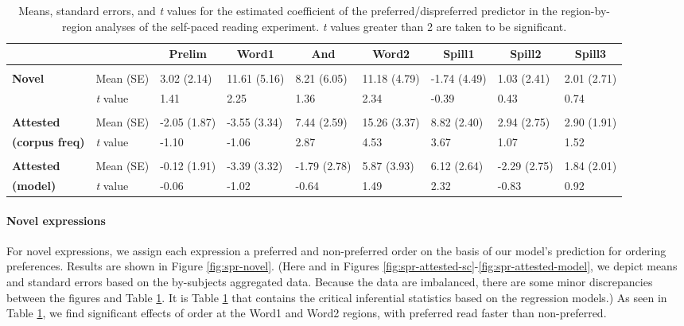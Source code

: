 \documentclass[authoryear]{elsarticle}
\begin{document}
%
\begin{table}[!tbp]
\scriptsize
\caption{Means, standard errors, and \emph{t} values for the estimated coefficient of the preferred/dispreferred predictor in the region-by-region analyses of the self-paced reading experiment. \emph{t} values greater than 2 are taken to be significant.\label{tab:spr-results}} 
\begin{center}
\begin{tabular}{lllllllll}
\hline\hline
\multicolumn{1}{l}{}&\multicolumn{1}{l}{}&\multicolumn{1}{c}{Prelim}&\multicolumn{1}{c}{Word1}&\multicolumn{1}{c}{And}&\multicolumn{1}{c}{Word2}&\multicolumn{1}{c}{Spill1}&\multicolumn{1}{c}{Spill2}&\multicolumn{1}{c}{Spill3}\tabularnewline
\hline
&&&&&&&\tabularnewline
\textbf{Novel}&Mean (SE)&3.02 (2.14)&11.61 (5.16)&8.21 (6.05)&11.18 (4.79)&-1.74 (4.49)&1.03 (2.41)&2.01 (2.71)\tabularnewline
&\emph{t} value&1.41&2.25&1.36&2.34&-0.39&0.43&0.74\tabularnewline
\hline
&&&&&&&\tabularnewline
\textbf{Attested}&Mean (SE)&-2.05 (1.87)&-3.55 (3.34)&7.44 (2.59)&15.26 (3.37)&8.82 (2.40)&2.94 (2.75)&2.90 (1.91)\tabularnewline
\textbf{(corpus freq)}&\emph{t} value&-1.10&-1.06&2.87&4.53&3.67&1.07&1.52\tabularnewline
\hline
&&&&&&&\tabularnewline
\textbf{Attested}&Mean (SE)&-0.12 (1.91)&-3.39 (3.32)&-1.79 (2.78)&5.87 (3.93)&6.12 (2.64)&-2.29 (2.75)&1.84 (2.01)\tabularnewline
\textbf{(model)}&\emph{t} value&-0.06&-1.02&-0.64&1.49&2.32&-0.83&0.92\tabularnewline
\hline
\end{tabular}
\end{center}
\end{table}

\paragraph{Novel expressions}
For novel expressions, we assign each expression a preferred and non-preferred order on the basis of our model's prediction for ordering preferences. Results are shown in Figure \ref{fig:spr-novel}. (Here and in Figures \ref{fig:spr-attested-sc}-\ref{fig:spr-attested-model}, we depict means and standard errors based on the by-subjects aggregated data. Because the data are imbalanced, there are some minor discrepancies between the figures and Table \ref{tab:spr-results}.  It is Table \ref{tab:spr-results} that contains the critical inferential statistics based on the regression models.) As seen in Table \ref{tab:spr-results}, we find significant effects of order at the Word1 and Word2 regions, with preferred read faster than non-preferred.
\end{document}
